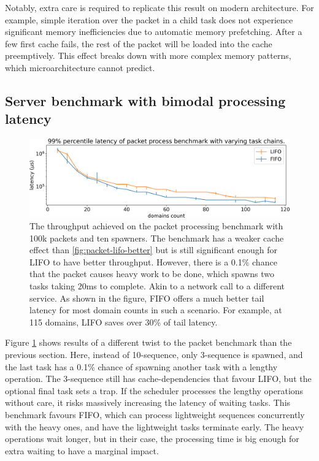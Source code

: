 \documentclass[12pt,a4paper,twoside]{report}
\begin{document}
Notably, extra care is required to replicate this result on modern architecture. For example, simple iteration over the packet in a child task does not experience significant memory inefficiencies due to automatic memory prefetching. After a few first cache fails, the rest of the packet will be loaded into the cache preemptively. This effect breaks down with more complex memory patterns, which microarchitecture cannot predict. 

\subsection{Server benchmark with bimodal processing latency}
\label{section:server-bench-with-multi-modal}

\begin{figure} 
    \centering 
    \includegraphics[width=1\textwidth]{eval/packet-basic-fifo-better.png}
    \caption{The throughput achieved on the packet processing benchmark with 100k packets and ten spawners. The benchmark has a weaker cache effect than \ref{fig:packet-lifo-better} but is still significant enough for LIFO to have better throughput. However, there is a 0.1\% chance that the packet causes heavy work to be done, which spawns two tasks taking 20ms to complete. Akin to a network call to a different service. As shown in the figure, FIFO offers a much better tail latency for most domain counts in such a scenario. For example, at 115 domains, LIFO saves over 30\% of tail latency.}
   \label{fig:packet-fifo-better}
\end{figure}

Figure \ref{fig:packet-fifo-better} shows results of a different twist to the packet benchmark than the previous section. Here, instead of 10-sequence, only 3-sequence is spawned, and the last task has a 0.1\% chance of spawning another task with a lengthy operation. The 3-sequence still has cache-dependencies that favour LIFO, but the optional final task sets a trap. If the scheduler processes the lengthy operations without care, it risks massively increasing the latency of waiting tasks. This benchmark favours FIFO, which can process lightweight sequences concurrently with the heavy ones, and have the lightweight tasks terminate early. The heavy operations wait longer, but in their case, the processing time is big enough for extra waiting to have a marginal impact. 
\end{document}
